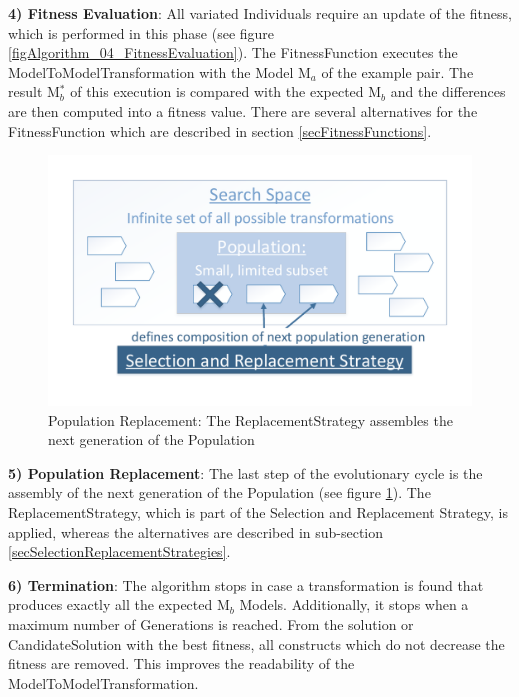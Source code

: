 \textbf{4) Fitness Evaluation}: All variated \glspl{Individual} require an update of the fitness, which is performed in this phase (see figure \ref{figAlgorithm_04_FitnessEvaluation}). The \gls{FitnessFunction} executes the \gls{ModelToModelTransformation} with the \gls{Model} M$_a$ of the example pair. The result M$_b^*$ of this execution is compared with the expected M$_b$ and the differences are then computed into a fitness value. There are several alternatives for the \gls{FitnessFunction} which are described in section \ref{secFitnessFunctions}.

\begin{figure}[htb]
	\centering
	\includegraphics[scale=0.5, trim=0cm 1cm 0cm 1cm, clip=true]{Images/Algorithm_05_Replacement.pdf} 
	\caption{Population Replacement: The \gls{ReplacementStrategy} assembles the next generation of the \gls{Population}}
	\label{figAlgorithm_05_Replacement}
\end{figure}

\textbf{5) Population Replacement}: The last step of the evolutionary cycle is the assembly of the next generation of the \gls{Population} (see figure \ref{figAlgorithm_05_Replacement}). The \gls{ReplacementStrategy}, which is part of the Selection and Replacement Strategy, is applied, whereas the alternatives are described in sub-section \ref{secSelectionReplacementStrategies}.

\textbf{6) Termination}: The algorithm stops in case a transformation is found that produces exactly all the expected M$_b$ \glspl{Model}. Additionally, it stops when a maximum number of \glspl{Generation} is reached. From the solution or \gls{CandidateSolution} with the best fitness, all constructs which do not decrease the fitness are removed. This improves the readability of the \gls{ModelToModelTransformation}.


